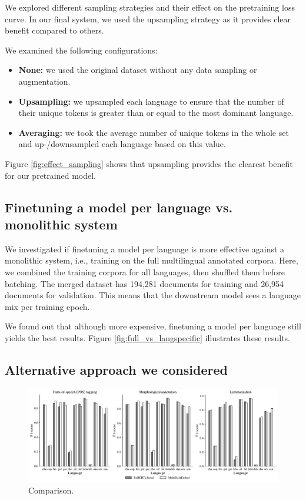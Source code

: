 \documentclass[11pt]{article}
\begin{document}
We explored different sampling strategies and their effect on the pretraining loss curve.
In our final system, we used the upsampling strategy as it provides clear benefit compared to others.

We examined the following configurations:
\begin{itemize}
  \item \textbf{None:} we used the original dataset without any data sampling or augmentation.
  \item \textbf{Upsampling:} we upsampled each language to ensure that the number of their unique tokens is greater than or equal to the most dominant language.
  \item \textbf{Averaging:} we took the average number of unique tokens in the whole set and up-/downsampled each language based on this value.
\end{itemize}

Figure \ref{fig:effect_sampling} shows that upsampling provides the clearest benefit for our pretrained model.

\subsection{Finetuning a model per language vs. monolithic system}

We investigated if finetuning a model per language is more effective against a monolithic system, i.e., training on the full multilingual annotated corpora.
Here, we combined the training corpora for all languages, then shuffled them before batching.
The merged dataset has 194,281 documents for training and 26,954 documents for validation.
This means that the downstream model sees a language mix per training epoch.

We found out that although more expensive, finetuning a model per language still yields the best results. 
Figure \ref{fig:full_vs_langspecific} illustrates these results.


\subsection{Alternative approach we considered}

\begin{figure}[t]
\centering
\includegraphics[width=\textwidth]{figures/hashembed.pdf}
\caption{Comparison.}
\label{fig:hashembed}
\end{figure}
\end{document}
